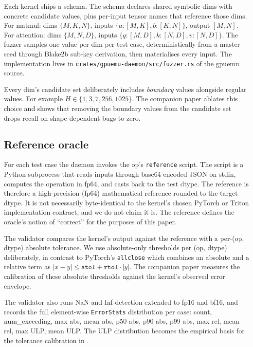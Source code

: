 \documentclass[runningheads]{llncs}
\begin{document}
Each kernel ships a schema. The schema declares shared symbolic dims with
concrete candidate values, plus per-input tensor names that reference
those dims. For matmul: dims $\{M, K, N\}$, inputs $\{a:[M,K], b:[K,N]\}$,
output $[M,N]$. For attention: dims $\{M, N, D\}$, inputs
$\{q:[M,D], k:[N,D], v:[N,D]\}$. The fuzzer samples one value per dim
per test case, deterministically from a master seed through Blake2b
sub-key derivation, then materialises every input. The implementation
lives in \texttt{crates/gpuemu-daemon/src/fuzzer.rs} of the gpuemu
source.

Every dim's candidate set deliberately includes \emph{boundary} values
alongside regular values. For example $H \in \{1, 3, 7, 256, 1025\}$. The
companion paper \cite{gpuemuP3} ablates this choice and shows
that removing the boundary values from the candidate set drops recall
on shape-dependent bugs to zero.

\subsection{Reference oracle}
\label{sec:method:oracle}

For each test case the daemon invokes the op's \texttt{reference}
script. The script is a Python subprocess that reads inputs through
base64-encoded JSON on stdin, computes the operation in fp64, and
casts back to the test dtype. The reference is therefore a
high-precision (fp64) mathematical reference rounded to the target
dtype. It is not necessarily byte-identical to the kernel's chosen
PyTorch or Triton implementation contract, and we do not claim it is.
The reference defines the oracle's notion of ``correct'' for the
purposes of this paper.

The validator compares the kernel's output against the reference with
a per-(op, dtype) absolute tolerance. We use absolute-only thresholds
per (op, dtype) deliberately, in contrast to PyTorch's
\texttt{allclose} which combines an absolute and a relative term as
$|x - y| \leq \texttt{atol} + \texttt{rtol} \cdot |y|$. The companion
paper \cite{gpuemuP2} measures the calibration of these absolute
thresholds against the kernel's observed error envelope.

The validator also runs NaN and Inf detection extended to fp16 and
bf16, and records the full element-wise \texttt{ErrorStats}
distribution per case: count, num\_exceeding, max abs, mean abs, p50
abs, p90 abs, p99 abs, max rel, mean rel, max ULP, mean ULP. The ULP
distribution becomes the empirical basis for the tolerance
calibration in \cite{gpuemuP2}.
\end{document}
